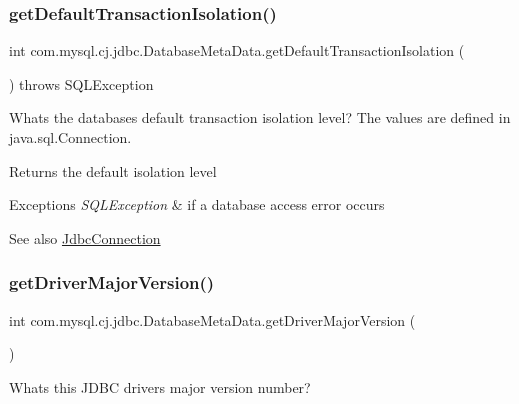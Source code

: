 \subsubsection{\texorpdfstring{get\+Default\+Transaction\+Isolation()}{getDefaultTransactionIsolation()}}
{\footnotesize\ttfamily int com.\+mysql.\+cj.\+jdbc.\+Database\+Meta\+Data.\+get\+Default\+Transaction\+Isolation (\begin{DoxyParamCaption}{ }\end{DoxyParamCaption}) throws S\+Q\+L\+Exception}

What\textquotesingle{}s the database\textquotesingle{}s default transaction isolation level? The values are defined in java.\+sql.\+Connection.

\begin{DoxyReturn}{Returns}
the default isolation level 
\end{DoxyReturn}

\begin{DoxyExceptions}{Exceptions}
{\em S\+Q\+L\+Exception} & if a database access error occurs \\
\hline
\end{DoxyExceptions}
\begin{DoxySeeAlso}{See also}
\mbox{\hyperlink{interfacecom_1_1mysql_1_1cj_1_1jdbc_1_1_jdbc_connection}{Jdbc\+Connection}} 
\end{DoxySeeAlso}
\mbox{\label{classcom_1_1mysql_1_1cj_1_1jdbc_1_1_database_meta_data_a80f700598836ec9d9b8c94fa2baffb36}} 
\subsubsection{\texorpdfstring{get\+Driver\+Major\+Version()}{getDriverMajorVersion()}}
{\footnotesize\ttfamily int com.\+mysql.\+cj.\+jdbc.\+Database\+Meta\+Data.\+get\+Driver\+Major\+Version (\begin{DoxyParamCaption}{ }\end{DoxyParamCaption})}

What\textquotesingle{}s this J\+D\+BC driver\textquotesingle{}s major version number?

